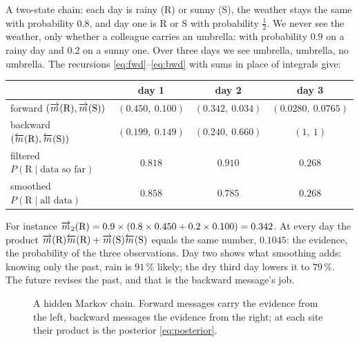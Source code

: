 \begin{example}
A two-state chain: each day is rainy (R) or sunny (S), the weather stays the same with probability $0.8$, and
day one is R or S with probability $\tfrac12$. We never see the weather, only whether a colleague carries an
umbrella: with probability $0.9$ on a rainy day and $0.2$ on a sunny one. Over three days we see umbrella,
umbrella, no umbrella. The recursions \eqref{eq:fwd}--\eqref{eq:bwd} with sums in place of integrals give:
\begin{center}\small
\begin{tabular}{@{}lccc@{}}
\toprule
 & day 1 & day 2 & day 3 \\
\midrule
forward $(\overrightarrow{m}(\mathrm R),\overrightarrow{m}(\mathrm S))$ & $(0.450,\ 0.100)$ & $(0.342,\ 0.034)$ & $(0.0280,\ 0.0765)$ \\
backward $(\overleftarrow{m}(\mathrm R),\overleftarrow{m}(\mathrm S))$ & $(0.199,\ 0.149)$ & $(0.240,\ 0.660)$ & $(1,\ 1)$ \\
filtered $P(\mathrm R\mid\text{data so far})$ & $0.818$ & $0.910$ & $0.268$ \\
smoothed $P(\mathrm R\mid\text{all data})$ & $0.858$ & $0.785$ & $0.268$ \\
\bottomrule
\end{tabular}
\end{center}
For instance $\overrightarrow{m}_2(\mathrm R)=0.9\times(0.8\times0.450+0.2\times0.100)=0.342$. At every day the product
$\overrightarrow{m}(\mathrm R)\overleftarrow{m}(\mathrm R)+\overrightarrow{m}(\mathrm S)\overleftarrow{m}(\mathrm S)$ equals the same number, $0.1045$: the evidence, the probability of the
three observations. Day two shows what smoothing adds: knowing only the past, rain is $91\,\%$ likely; the dry
third day lowers it to $79\,\%$. The future revises the past, and that is the backward message's job.
\end{example}

\begin{figure}[h]\centering
{}
\caption{A hidden Markov chain. Forward messages carry the evidence from the left, backward messages the
evidence from the right; at each site their product is the posterior \eqref{eq:posterior}.}
\label{fig:chaingraph}
\end{figure}

